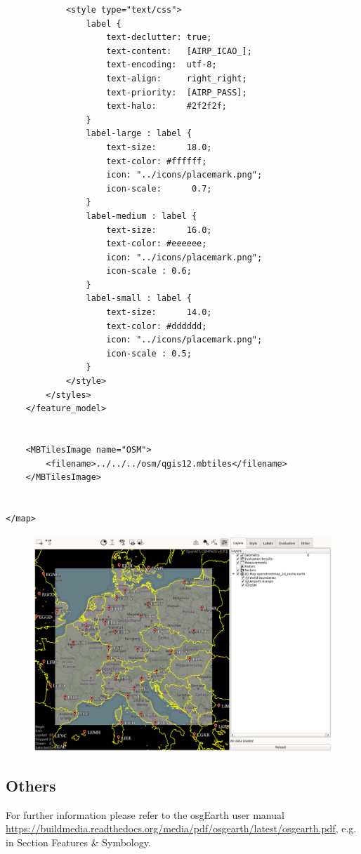 \begin{lstlisting}
            <style type="text/css">   
                label {
                    text-declutter: true;
                    text-content:   [AIRP_ICAO_];
                    text-encoding:  utf-8;
                    text-align:     right_right;
                    text-priority:  [AIRP_PASS];
                    text-halo:      #2f2f2f;
                }                
                label-large : label {
                    text-size:      18.0;
                    text-color: #ffffff;
                    icon: "../icons/placemark.png";
                    icon-scale:      0.7;
                }
                label-medium : label {
                    text-size:      16.0;
                    text-color: #eeeeee;
                    icon: "../icons/placemark.png";
                    icon-scale : 0.6;
                }           
                label-small : label {
                    text-size:      14.0;
                    text-color: #dddddd;
                    icon: "../icons/placemark.png";
                    icon-scale : 0.5;
                }
            </style>
        </styles>
    </feature_model>
    
    
    <MBTilesImage name="OSM">
        <filename>../../../osm/qgis12.mbtiles</filename>
    </MBTilesImage>

    
</map>

\end{lstlisting}

\begin{figure}[H]
    \hspace*{-2.5cm}
    \includegraphics[width=19cm,frame]{figures/osgview_qgis_osm2.png}
\end{figure}

 
\subsection{Others}

For further information please refer to the osgEarth user manual \url{https://buildmedia.readthedocs.org/media/pdf/osgearth/latest/osgearth.pdf}, e.g. in Section Features \& Symbology.
 
